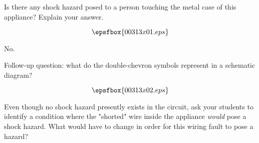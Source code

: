 

Is there any shock hazard posed to a person touching the metal case of this appliance?  Explain your answer.

$$\epsfbox{00313x01.eps}$$







No.

\vskip 10pt

Follow-up question: what do the double-chevron symbols represent in a schematic diagram?

$$\epsfbox{00313x02.eps}$$







Even though no shock hazard presently exists in the circuit, ask your students to identify a condition where the "shorted" wire inside the appliance {\it would} pose a shock hazard.  What would have to change in order for this wiring fault to pose a hazard?




